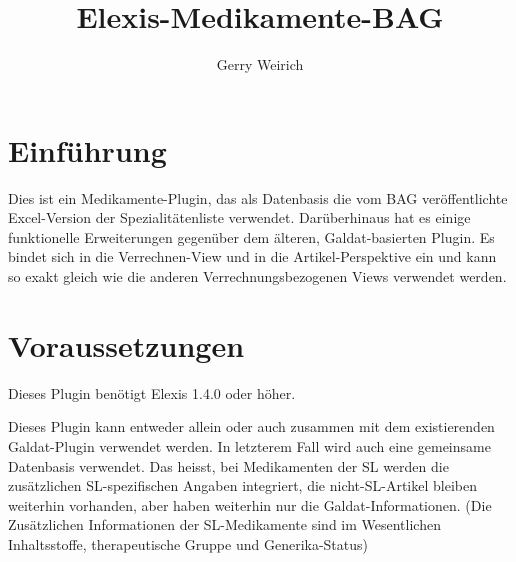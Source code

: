 \documentclass[a4paper]{scrartcl}
\title{Elexis-Medikamente-BAG}
\author{Gerry Weirich}
\begin{document}
\maketitle
\section{Einführung}

Dies ist ein Medikamente-Plugin, das als Datenbasis die vom BAG veröffentlichte Excel\texttrademark-Version der Spezialitätenliste verwendet. Darüberhinaus hat es einige funktionelle Erweiterungen gegenüber dem älteren, Galdat-basierten Plugin. Es bindet sich in die Verrechnen-View und in die Artikel-Perspektive ein und kann so exakt gleich wie die anderen Verrechnungsbezogenen Views verwendet werden.

\section{Voraussetzungen}
Dieses Plugin benötigt Elexis 1.4.0 oder höher.

\medskip

Dieses Plugin kann entweder allein oder auch zusammen mit dem existierenden Galdat-Plugin verwendet werden. In letzterem Fall wird auch eine gemeinsame Datenbasis verwendet. Das heisst, bei Medikamenten der SL werden die zusätzlichen SL-spezifischen Angaben integriert, die nicht-SL-Artikel bleiben weiterhin vorhanden, aber haben weiterhin nur die Galdat-Informationen. (Die Zusätzlichen Informationen der SL-Medikamente sind im Wesentlichen Inhaltsstoffe, therapeutische Gruppe und Generika-Status)
\end{document}
